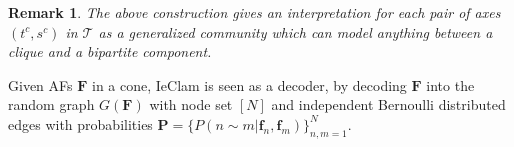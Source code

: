 \documentclass[letterpaper]{article} %
\newtheorem{remark}[theorem]{Remark}
\begin{document}
\begin{remark}
    The above construction gives an interpretation for each pair of axes $(t^c,s^c)$ in $\mathcal{T}$ as a \emph{generalized community} which can model anything between a clique and a bipartite component.
\end{remark}


Given AFs $\mathbf{F}$ in a cone, IeClam is seen as a decoder, by decoding $\mathbf{F}$ into the random graph $G(\mathbf{F})$ with node set $[N]$ and independent Bernoulli distributed edges with probabilities $\mathbf{P}=\{P(n\sim m|\mathbf{f}_n, \mathbf{f}_m)\}_{n,m=1}^N$.
\end{document}
